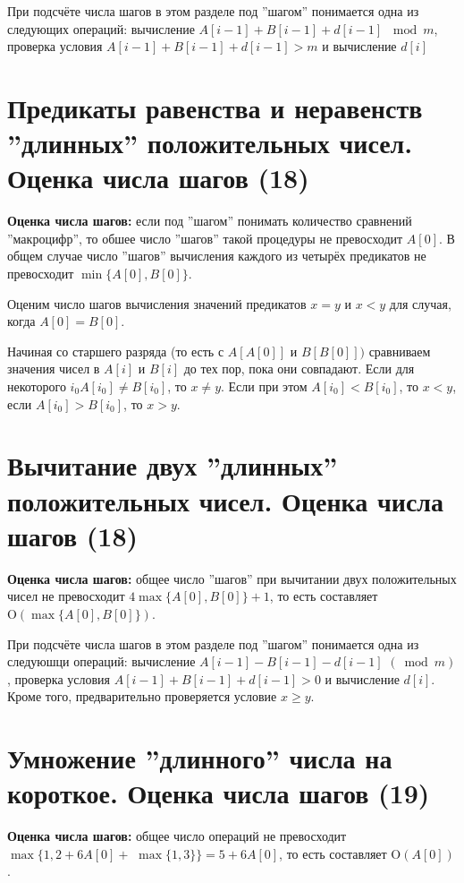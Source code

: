 \documentclass[40pt]{article}
\begin{document}
При подсчёте числа шагов в этом разделе под ''шагом'' понимается одна из следующих операций: вычисление $A[i-1]+B[i-1]+d[i-1]$ $\bmod m$, проверка условия $A[i-1]+B[i-1]+d[i-1]>m$ и вычисление $d[i]$


\section{Предикаты равенства и неравенств ''длинных'' положительных чисел. Оценка числа шагов (18)}

\textbf{Оценка числа шагов:} если под ''шагом'' понимать количество сравнений ''макроцифр'', то обшее число ''шагов'' такой процедуры не превосходит $A[0]$. В общем случае число ''шагов'' вычисления каждого из четырёх предикатов не превосходит $\min \{A[0], B[0]\}$.


Оценим число шагов вычисления значений предикатов $x=y$ и $x<y$ для случая, когда $A[0]=B[0]$.

Начиная со старшего разряда (то есть с $A[A[0]]$ и $B[B[0]])$ сравниваем значения чисел в $A[i]$ и $B[i]$ до тех пор, пока они совпадают. Если для некоторого $i_{0} A\left[i_{0}\right] \neq B\left[i_{0}\right]$, то $x \neq y$. Если при этом $A\left[i_{0}\right]<B\left[i_{0}\right]$, то $x<y$, если $A\left[i_{0}\right]>B\left[i_{0}\right]$, то $x>y$.


\section{Вычитание двух ''длинных'' положительных чисел. Оценка числа шагов (18)}

\textbf{Оценка числа шагов:} общее число  ''шагов'' при вычитании двух положительных чисел не превосходит $4 \max \{A[0], B[0]\}+1$, то есть составляет $\mathrm{O}(\max \{A[0], B[0]\})$.

При подсчёте числа шагов в этом разделе под ''шагом'' понимается одна из следуюшци операций: вычисление $A[i-1]-B[i-1]-d[i-1]$ $(\bmod m)$, проверка условия $A[i-1]+B[i-1]+d[i-1]>0$ и вычисление $d[i]$. Кроме того, предварительно проверяется условие $x \geq y$.




\section{Умножение ''длинного'' числа на короткое. Оценка числа шагов (19)}

\textbf{Оценка числа шагов:} общее число операций не превосходит $\max \{1,2+6 A[0]+$ $\max \{1,3\}\}=5+6 A[0]$, то есть составляет $\mathrm{O}(A[0])$.
\end{document}
